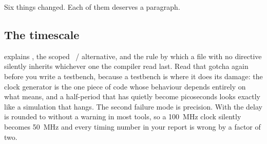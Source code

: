 
Six things changed. Each of them deserves a paragraph.

\subsection{The timescale}

 explains
, the scoped ~/ 
alternative, and the rule by which a file with no directive silently inherits
whichever one the compiler read last. Read that gotcha again before you write a
testbench, because a testbench is where it does its damage: the clock generator
is the one piece of code whose behaviour depends entirely on what 
means, and a half-period that has quietly become picoseconds looks exactly like
a simulation that hangs. The second failure mode is precision. With
 the delay  is rounded to  without a
warning in most tools, so a \SI{100}{\mega\hertz} clock silently becomes
\SI{50}{\mega\hertz} and every timing number in your report is wrong by a
factor of two.

